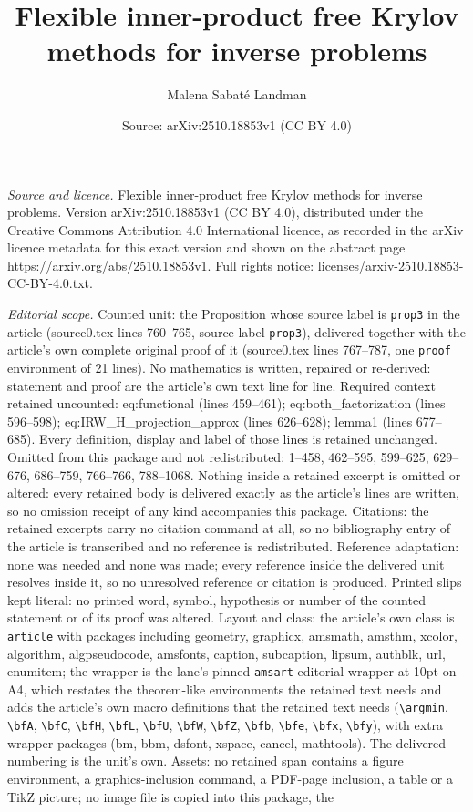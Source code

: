 \documentclass[10pt,a4paper]{amsart}
\title[Flexible inner-product free Krylov methods for inverse probl]{Flexible inner-product free Krylov methods for inverse problems}
\author{Malena Sabat\'e Landman}
\date{Source: arXiv:2510.18853v1 (CC BY 4.0)}
\begin{document}
\maketitle

\noindent\emph{Source and licence.} Flexible inner-product free Krylov methods for inverse problems. Version arXiv:2510.18853v1 (CC BY 4.0), distributed under the Creative Commons Attribution 4.0 International licence, as recorded in the arXiv licence metadata for this exact version and shown on the abstract page https://arxiv.org/abs/2510.18853v1. Full rights notice: licenses/arxiv-2510.18853-CC-BY-4.0.txt.\par\smallskip

\noindent\textit{Editorial scope.} Counted unit: the Proposition whose source label is \texttt{prop3} in the article (source0.tex lines 760--765, source label \texttt{prop3}), delivered together with the article's own complete original proof of it (source0.tex lines 767--787, one \texttt{proof} environment of 21 lines). No mathematics is written, repaired or re-derived: statement and proof are the article's own text line for line. Required context retained uncounted: eq:functional (lines 459--461); eq:both\_factorization (lines 596--598); eq:IRW\_H\_projection\_approx (lines 626--628); lemma1 (lines 677--685). Every definition, display and label of those lines is retained unchanged. Omitted from this package and not redistributed: 1--458, 462--595, 599--625, 629--676, 686--759, 766--766, 788--1068. Nothing inside a retained excerpt is omitted or altered: every retained body is delivered exactly as the article's lines are written, so no omission receipt of any kind accompanies this package. Citations: the retained excerpts carry no citation command at all, so no bibliography entry of the article is transcribed and no reference is redistributed. Reference adaptation: none was needed and none was made; every reference inside the delivered unit resolves inside it, so no unresolved reference or citation is produced. Printed slips kept literal: no printed word, symbol, hypothesis or number of the counted statement or of its proof was altered. Layout and class: the article's own class is \texttt{article} with packages including geometry, graphicx, amsmath, amsthm, xcolor, algorithm, algpseudocode, amsfonts, caption, subcaption, lipsum, authblk, url, enumitem; the wrapper is the lane's pinned \texttt{amsart} editorial wrapper at 10pt on A4, which restates the theorem-like environments the retained text needs and adds the article's own macro definitions that the retained text needs (\texttt{\textbackslash argmin}, \texttt{\textbackslash bfA}, \texttt{\textbackslash bfC}, \texttt{\textbackslash bfH}, \texttt{\textbackslash bfL}, \texttt{\textbackslash bfU}, \texttt{\textbackslash bfW}, \texttt{\textbackslash bfZ}, \texttt{\textbackslash bfb}, \texttt{\textbackslash bfe}, \texttt{\textbackslash bfx}, \texttt{\textbackslash bfy}), with extra wrapper packages (bm, bbm, dsfont, xspace, cancel, mathtools). The delivered numbering is the unit's own. Assets: no retained span contains a figure environment, a graphics-inclusion command, a PDF-page inclusion, a table or a TikZ picture; no image file is copied into this package, the 
\end{document}
